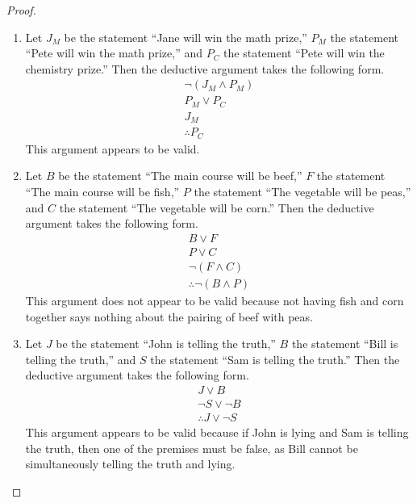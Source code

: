\documentclass[12pt]{amsart}
\theoremstyle{definition}
\theoremstyle{remark}
\begin{document}
\begin{proof}
\hfill
\begin{enumerate}
	\item Let $J_M$ be the statement ``Jane will win the math prize,'' $P_M$ the statement ``Pete will win the math prize,'' and $P_C$ the statement ``Pete will win the chemistry prize.''
	Then the deductive argument takes the following form.
	\begin{equation*}
		\begin{array}{l}
			\neg (J_M \wedge P_M) \\
			P_M \vee P_C \\
			J_M \\
			\hline
			\therefore P_C
		\end{array}
	\end{equation*}
	This argument appears to be valid.
	
	\item Let $B$ be the statement ``The main course will be beef,'' $F$ the statement ``The main course will be fish,'' $P$ the statement ``The vegetable will be peas,'' and $C$ the statement ``The vegetable will be corn.''
	Then the deductive argument takes the following form.
	\begin{equation*}
		\begin{array}{l}
			B \vee F \\
			P \vee C \\
			\neg (F \wedge C) \\
			\hline
			\therefore \neg (B \wedge P)
		\end{array}
	\end{equation*}
	This argument does not appear to be valid because not having fish and corn together says nothing about the pairing of beef with peas.
	
	\item Let $J$ be the statement ``John is telling the truth,'' $B$ the statement ``Bill is telling the truth,'' and $S$ the statement ``Sam is telling the truth.''
	Then the deductive argument takes the following form.
	\begin{equation*}
		\begin{array}{l}
			J \vee B \\
			\neg S \vee \neg B \\
			\hline
			\therefore J \vee \neg S
		\end{array}
	\end{equation*}
	This argument appears to be valid because if John is lying and Sam is telling the truth, then one of the premises must be false, as Bill cannot be simultaneously telling the truth and lying.
	

\end{enumerate}
\end{proof}
\end{document}

